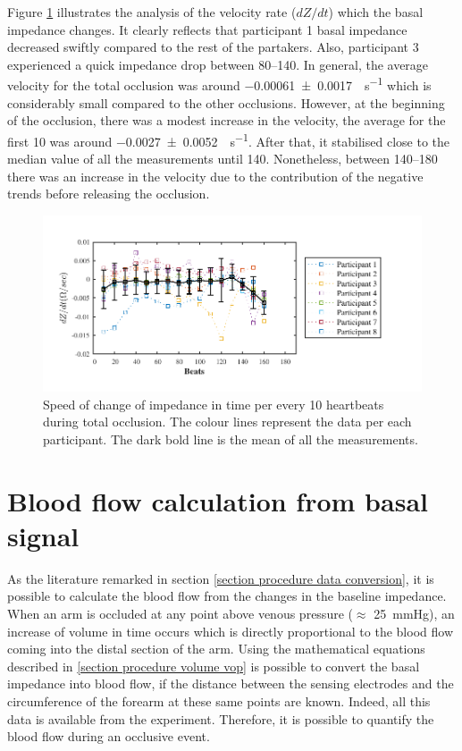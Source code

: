 Figure \ref{fig:total occlusion change} illustrates the analysis of the velocity rate ($dZ/dt$) which the basal impedance changes. It clearly reflects that participant 1 basal impedance decreased swiftly compared to the rest of the partakers. Also, participant 3 experienced a quick impedance drop between \SIrange{80}{140}{\beats}. In general, the average velocity for the total occlusion was around \SI{-0.00061(000170)}{\Omega\per\second} which is considerably small compared to the other occlusions. However, at the beginning of the occlusion, there was a modest increase in the velocity, the average for the first \SI{10}{\beats} was around \SI{-0.0027(00052)}{\Omega\per\second}. After that, it stabilised close to the median value of all the measurements until \SI{140}{\beats}. Nonetheless, between \SIrange{140}{180}{\beats} there was an increase in the velocity due to the contribution of the negative trends before releasing the occlusion. 

\begin{figure}[htbp]
	\centering
	\includegraphics[width=15cm,keepaspectratio]{figure_vop_9}    
	\caption[Rate of change of impedance per 10 heartbeats during total occlusion]{Speed of change of impedance in time per every 10 heartbeats during total occlusion. The colour lines represent the data per each participant. The dark bold line is the mean of all the measurements.}
	\label{fig:total occlusion change}
\end{figure} 




\section{Blood flow calculation from basal signal}
\label{section occlusion flow basal}
As the literature remarked in section \ref{section procedure data conversion}, it is possible to calculate the blood flow from the changes in the baseline impedance. When an arm is occluded at any point above venous pressure ($\approx$ \SI{25}{\mmHg}), an increase of volume in time occurs which is directly proportional to the blood flow coming into the distal section of the arm. Using the mathematical equations described in \ref{section procedure volume vop} is possible to convert the basal impedance into blood flow, if the distance between the sensing electrodes and the circumference of the forearm at these same points are known. Indeed, all this data is available from the experiment. Therefore, it is possible to quantify the blood flow during an occlusive event.  

